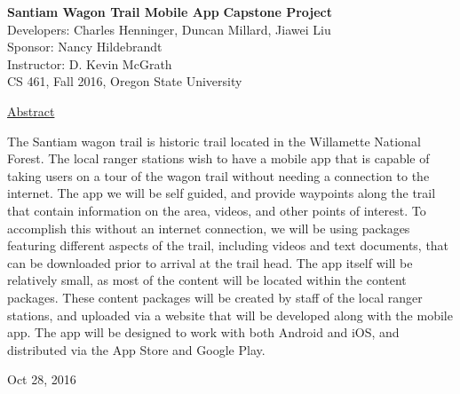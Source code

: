 \documentclass[letterpaper,10pt,titlepage]{article}
\begin{document}
\begin{titlepage}
\begin{center}
    \Huge
    \textbf{Santiam Wagon Trail Mobile App}
    \textbf{Capstone Project}\\
    \vspace{1.0cm}
    \large
    Developers: Charles Henninger, Duncan Millard, Jiawei Liu\\
    Sponsor: Nancy Hildebrandt\\
    \vspace{1.5cm}
    \large
    Instructor: D. Kevin McGrath\\

    \large
    CS 461, Fall 2016, Oregon State University\\
    
    \vspace{0.5cm}

    \vspace{2.5cm}
    \large
    \underline{Abstract}\\
    \vspace{0.3cm}
    \end{center}
    \large
    
    The Santiam wagon trail is historic trail located in the Willamette National Forest. The local ranger stations wish to have a mobile app that is capable of taking users on a tour of the wagon trail without needing a connection to the internet. The app we will be self guided, and provide waypoints along the trail that contain information on the area, videos, and other points of interest. To accomplish this without an internet connection, we will be using packages featuring different aspects of the trail, including videos and text documents, that can be downloaded prior to arrival at the trail head. The app itself will be relatively small, as most of the content will be located within the content packages.  These content packages will be created by staff of the local ranger stations, and uploaded via a website that will be developed along with the mobile app. The app will be designed to work with both Android and iOS, and distributed via the App Store and Google Play.


    
    \vspace{0.8cm}
    \vfill
    
\begin{center}    
    Oct 28, 2016

\end{center}
\end{titlepage}
\end{document}
